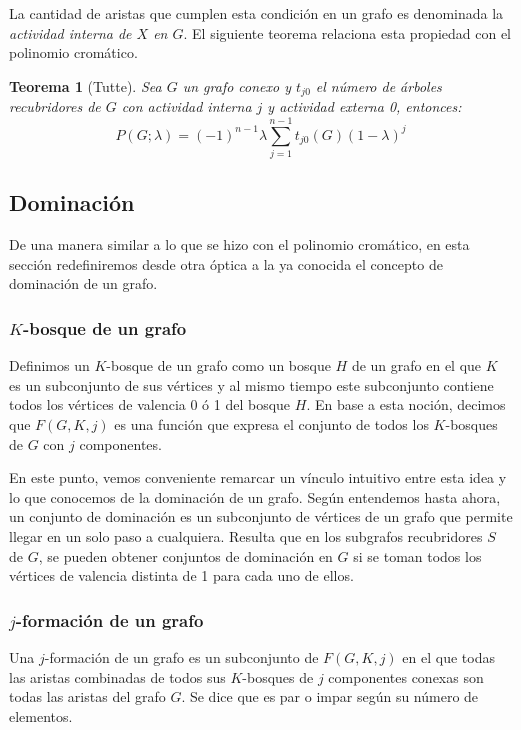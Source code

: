 \documentclass{article}
\newtheorem{thm}{Teorema}[section]
\numberwithin{figure}{section}
\begin{document}
La cantidad de aristas que cumplen esta condición en un grafo es denominada la \emph{actividad interna de $X$ en $G$}. El siguiente teorema relaciona esta propiedad con el polinomio cromático.

\begin{thm}[Tutte]
    Sea $G$ un grafo conexo y $t_{j0}$ el número de árboles recubridores de $G$ con actividad interna $j$ y actividad externa 0, entonces:
    \begin{equation*}
        P(G; \lambda) = (-1)^{n-1}\lambda \sum_{j=1}^{n-1} t_{j0}(G)(1-\lambda)^j
    \end{equation*}
\end{thm}

\subsection{Dominación}

De una manera similar a lo que se hizo con el polinomio cromático, en esta sección redefiniremos desde otra óptica a la ya conocida el concepto de dominación de un grafo.

\subsubsection{$K$-bosque de un grafo}

Definimos un $K$-bosque de un grafo como un bosque $H$ de un grafo en el que $K$ es un subconjunto de sus vértices y al mismo tiempo este subconjunto contiene todos los vértices de valencia 0 ó 1 del bosque $H$. En base a esta noción, decimos que $F(G, K, j)$ es una función que expresa el conjunto de todos los $K$-bosques de $G$ con $j$ componentes.

En este punto, vemos conveniente remarcar un vínculo intuitivo entre esta idea y lo que conocemos de la dominación de un grafo. Según entendemos hasta ahora, un conjunto de dominación es un subconjunto de vértices de un grafo que permite llegar en un solo paso a cualquiera. Resulta que en los subgrafos recubridores $S$ de $G$, se pueden obtener conjuntos de dominación en $G$ si se toman todos los vértices de valencia distinta de 1 para cada uno de ellos.

\subsubsection{$j$-formación de un grafo}

Una $j$-formación de un grafo es un subconjunto de $F(G, K, j)$ en el que todas las aristas combinadas de todos sus $K$-bosques de $j$ componentes conexas son todas las aristas del grafo $G$. Se dice que es par o impar según su número de elementos.
\end{document}

